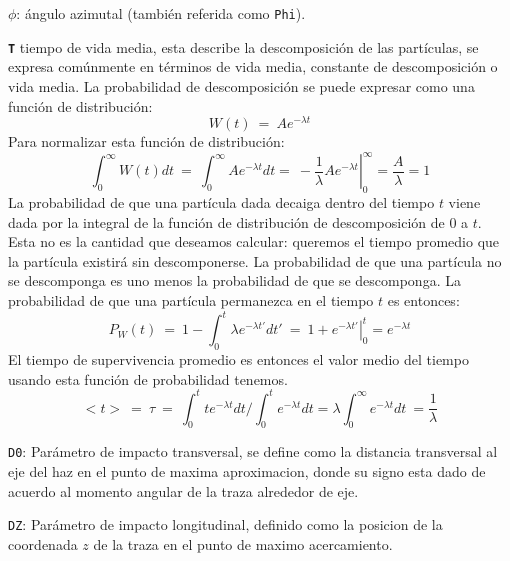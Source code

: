 \begin{itemize_f}
\item[-] $\mathtt{\phi}$: ángulo azimutal (también referida como \texttt{Phi}).\\
\item[-] \textbf{\texttt{T}} tiempo de vida media, esta describe la descomposición de las partículas, se expresa comúnmente en términos de vida media, constante de descomposición o vida media. La probabilidad de descomposición se puede expresar como una función de distribución:
\begin{equation}
W (t)~ = ~ A e^{-\lambda t} 
\end{equation}
Para normalizar esta función de distribución:
\begin{equation}
\int_0^\infty W (t) dt ~ = ~ \int_0^\infty A e^{-\lambda t} dt = ~ - \left. \dfrac{1}{\lambda} A e^{-\lambda t} \right|_0^\infty = \dfrac{A}{\lambda} = 1
\end{equation}
La probabilidad de que una partícula dada decaiga dentro del tiempo $t$ viene dada por la integral de la función de distribución de descomposición de $0$ a $t$. Esta no es la cantidad que deseamos calcular: queremos el tiempo promedio que la partícula existirá sin descomponerse. La probabilidad de que una partícula no se descomponga es uno menos la probabilidad de que se descomponga. La probabilidad de que una partícula permanezca en el tiempo $t$ es entonces:
\begin{equation}
P_W(t) ~ = ~ 1 - \int_0^t \lambda e^{-\lambda t'} dt' ~ = ~ 1 +  \left. e^{-\lambda t'} \right|_0^t = e^{-\lambda t}
\end{equation}
El tiempo de supervivencia promedio es entonces el valor medio del tiempo usando esta función de probabilidad tenemos.
\begin{equation}
<t>~ = ~ \tau ~ = ~ \int_0^t te^{-\lambda t} dt/\int_0^t e^{-\lambda t} dt = \lambda \int_0^\infty e^{-\lambda t} dt ~ = \dfrac{1}{\lambda}
\end{equation}

\item[-] \texttt{D0}: Parámetro de impacto transversal, se define como la distancia transversal al eje del haz en el punto de maxima aproximacion, donde su signo esta dado de acuerdo al momento angular de la traza alrededor de eje.\\

\item[-] \texttt{DZ}: Parámetro de impacto longitudinal, definido como la posicion de la coordenada $z$ de la traza en el punto de maximo acercamiento.\\
\end{itemize_f}


